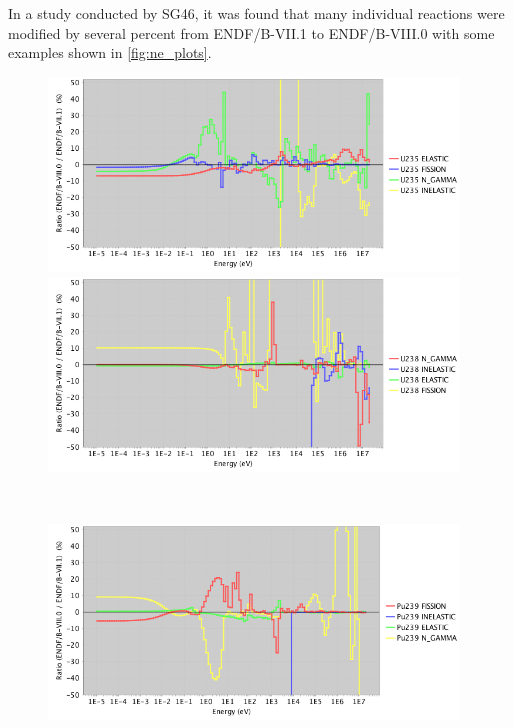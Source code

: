 \documentclass[letterpaper]{ar-1col}
\begin{document}
In a study conducted by SG46, it was found that many individual reactions were modified by several percent from ENDF/B-VII.1 to ENDF/B-VIII.0 with some examples shown in \autoref{fig:ne_plots}.



\begin{figure}
    \centering
    \begin{minipage}{0.5\textwidth}
        \centering
        \includegraphics[width=0.97\textwidth]{u235.png} %
    \end{minipage}\hfill
    \begin{minipage}{0.5\textwidth}
        \centering
        \includegraphics[width=0.97\textwidth]{u238.png} %
    \end{minipage}
    \\
    \centering
    \begin{minipage}{0.5\textwidth}
        \centering
        \includegraphics[width=0.97\textwidth]{pu239_1.png} %

\end{minipage}
\end{figure}
\end{document}
